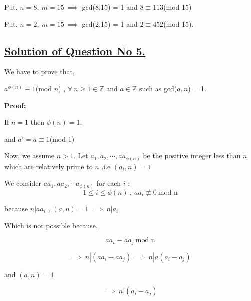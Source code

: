 \documentclass[a4paper,12pt]{article}
\begin{document}
    \vspace*{0.3cm}
    Put, $n = 8,\ m=15\ \implies$ gcd(8,15) = 1  and $8\equiv 113$(mod 15)


    \vspace*{0.3cm}
    Put, $n = 2,\ m=15\ \implies$ gcd(2,15) = 1  and $2\equiv 452$(mod 15).



\subsection*{\underline{Solution of Question No 5.}}

We have to prove that,


\vspace*{0.3cm}

$a^{\phi(n)}\equiv 1$(mod $n$) ,  $\forall\ n\geq 1 \in \mathbb{Z}$ and $a \in \mathbb{Z}$ such as gcd($a,n$) = 1.



\vspace*{0.3cm}

\underline{{\bf Proof:}}


\vspace*{0.3cm}

If $n=1$ then $\phi(n) = 1$.


\vspace*{0.3cm}

and  $a' = a \equiv 1$(mod 1)



\vspace*{0.3cm}
Now, we assume $n > 1.$ Let $a_1,a_2,\cdots ,aa_{\phi(n)}$
be the positive integer less than $n$ which are relatively prime to $n$ .i.e $(a_i,n) = 1$


\vspace*{0.3cm}

We consider $aa_1,aa_2,\cdots a_{\phi(n)}$ for each $i$ ;
$$1\leq i\leq \phi(n)\ ,\ aa_i\not\equiv 0\ \mbox{mod n}$$

because $n|aa_i$ , $(a,n) =1$ $\implies\ n|a_i$



\vspace*{0.3cm}

Which is not possible because,

$$aa_i\equiv aa_j\ \mbox{mod n}$$

$$\implies\ n|(aa_i - aa_j)\ \implies\ n|a(a_i-a_j)$$

and $(a,n) = 1$

$$\implies\ n|(a_i - a_j)$$
\end{document}
